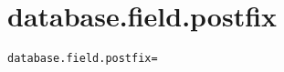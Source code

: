 \section{database.field.postfix}
\label{configuration:DatabaseFieldPostfix}
\AvailableInJavaOnly{\TODO}
\begin{lstlisting}[style=Props,caption={Usage example for \textit{database.field.postfix}}]
database.field.postfix=
\end{lstlisting}